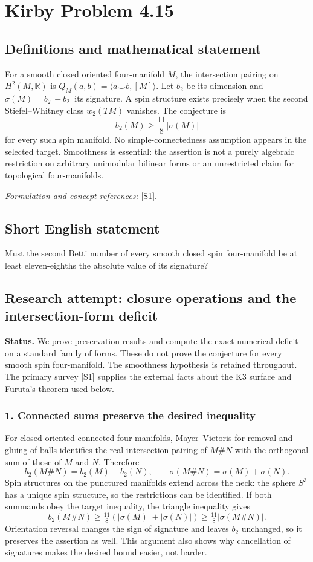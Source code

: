 \documentclass[11pt]{article}
\begin{document}
\section*{\texorpdfstring{Kirby Problem 4.15}{Kirby Problem 4.15}}\label{2891}
\subsection{Definitions and mathematical statement}
For a smooth closed oriented four-manifold $M$, the intersection pairing on
$H^2(M,{\mathbb{R}})$ is $Q_M(a,b)=\langle a\smile b,[M]\rangle$. Let $b_2$ be its dimension and $\sigma(M)=b_2^+-b_2^-$ its signature. A spin structure exists precisely when the second Stiefel--Whitney class $w_2(TM)$ vanishes. The conjecture is
\[
 b_2(M)\ge\frac{11}{8}|\sigma(M)|
\]
for every such spin manifold. No simple-connectedness assumption appears in the selected target. Smoothness is essential: the assertion is not a purely algebraic restriction on arbitrary unimodular bilinear forms or an unrestricted claim for topological four-manifolds.
\par\smallskip\textit{Formulation and concept references:} \href{https://web.stanford.edu/~cm5/4D.pdf}{[S1]}.

\subsection{Short English statement}
Must the second Betti number of every smooth closed spin four-manifold be at least eleven-eighths the absolute value of its signature?
\subsection{Research attempt: closure operations and the intersection-form deficit}
\textbf{Status.} We prove preservation results and compute the exact numerical deficit on a standard family of forms. These do not prove the conjecture for every smooth spin four-manifold. The smoothness hypothesis is retained throughout. The primary survey [S1] supplies the external facts about the K3 surface and Furuta's theorem used below.

\subsubsection{1. Connected sums preserve the desired inequality}
For closed oriented connected four-manifolds, Mayer--Vietoris for removal and gluing of balls identifies the real intersection pairing of $M\#N$ with the orthogonal sum of those of $M$ and $N$. Therefore
\[ b_2(M\#N)=b_2(M)+b_2(N),\qquad \sigma(M\#N)=\sigma(M)+\sigma(N).\]
Spin structures on the punctured manifolds extend across the neck: the sphere $S^3$ has a unique spin structure, so the restrictions can be identified. If both summands obey the target inequality, the triangle inequality gives
\[b_2(M\#N)\ge\tfrac{11}{8}(|\sigma(M)|+|\sigma(N)|)\ge\tfrac{11}{8}|\sigma(M\#N)|.\]
Orientation reversal changes the sign of signature and leaves $b_2$ unchanged, so it preserves the assertion as well. This argument also shows why cancellation of signatures makes the desired bound easier, not harder.
\end{document}
